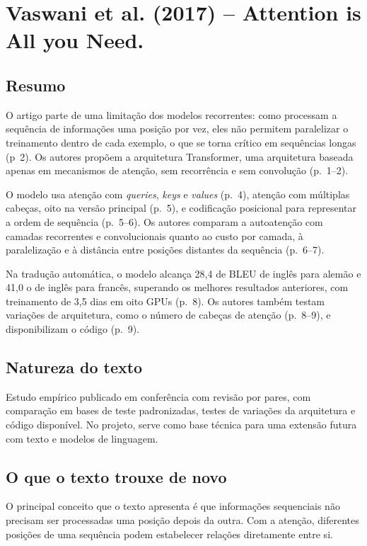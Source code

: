 \section{Vaswani et al. (2017) -- Attention is All you Need.}

\subsection*{Resumo}

O artigo parte de uma limitação dos modelos recorrentes: como processam a sequência de informações uma posição por vez, eles não permitem paralelizar o treinamento dentro de cada exemplo, o que se torna crítico em sequências longas (p~2). Os autores propõem a arquitetura Transformer, uma arquitetura baseada apenas em mecanismos de atenção, sem recorrência e sem convolução (p.~1--2).

O modelo usa atenção com \emph{queries}, \emph{keys} e \emph{values} (p.~4), atenção com múltiplas cabeças, oito na versão principal (p.~5), e codificação posicional para representar a ordem de sequência (p.~5--6). Os autores comparam a autoatenção com camadas recorrentes e convolucionais quanto ao custo por camada, à paralelização e à distância entre posições distantes da sequência (p.~6--7).

Na tradução automática, o modelo alcança 28,4 de BLEU de inglês para alemão e 41,0 o de inglês para francês, superando os melhores resultados anteriores, com treinamento de 3,5 dias em oito GPUs (p.~8). Os autores também testam variações de arquitetura, como o número de cabeças de atenção (p.~8--9), e disponibilizam o código (p.~9).

\subsection*{Natureza do texto}

Estudo empírico publicado em conferência com revisão por pares, com comparação em bases de teste padronizadas, testes de variações da arquitetura e código disponível. No projeto, serve como base técnica para uma extensão futura com texto e modelos de linguagem.

\subsection*{O que o texto trouxe de novo}

O principal conceito que o texto apresenta é que informações sequenciais não precisam ser processadas uma posição depois da outra. Com a atenção, diferentes posições de uma sequência podem estabelecer relações diretamente entre si.

